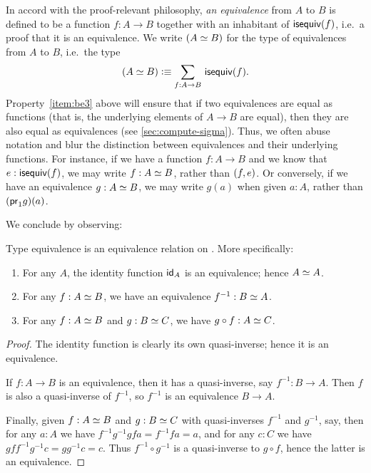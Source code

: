 In accord with the proof-relevant philosophy,
%
\emph{an equivalence} from $A$ to $B$ is defined to be a function $f:A\to B$ together with an inhabitant of $\isequiv (f)$, i.e.\ a proof that it is an equivalence.
We write $(\eqv A B)$ for the type of equivalences from $A$ to $B$, i.e.\ the type
\begin{equation}\label{eq:eqv}
  (\eqv A B) \defeq \sm{f:A\to B} \isequiv(f).
\end{equation}
Property~\ref{item:be3} above will ensure that if two equivalences are equal as functions (that is, the underlying elements of $A\to B$ are equal), then they are also equal as equivalences (see \cref{sec:compute-sigma}).
Thus, we often abuse notation and blur the distinction between equivalences and their underlying functions.
For instance, if we have a function $f:A\to B$ and we know that $e:\isequiv(f)$, we may write $f:\eqv A B$, rather than $\tup{f}{e}$.
Or conversely, if we have an equivalence $g:\eqv A B$, we may write $g(a)$ when given $a:A$, rather than $(\proj1 g)(a)$.

We conclude by observing:

\begin{lem}\label{thm:equiv-eqrel}
  Type equivalence is an equivalence relation on \type.
  More specifically:
  \begin{enumerate}
  \item For any $A$, the identity function $\idfunc[A]$ is an equivalence; hence $\eqv A A$.
  \item For any $f:\eqv A B$, we have an equivalence $f^{-1} : \eqv B A$.
  \item For any $f:\eqv A B$ and $g:\eqv B C$, we have $g\circ f : \eqv A C$.
  \end{enumerate}
\end{lem}
\begin{proof}
  The identity function is clearly its own quasi-inverse; hence it is an equivalence.

  If $f:A\to B$ is an equivalence, then it has a quasi-inverse, say $f^{-1}:B\to A$.
  Then $f$ is also a quasi-inverse of $f^{-1}$, so $f^{-1}$ is an equivalence $B\to A$.

  Finally, given $f:\eqv A B$ and $g:\eqv B C$ with quasi-inverses $f^{-1}$ and $g^{-1}$, say, then for any $a:A$ we have $f^{-1} g^{-1} g f a = f^{-1} f a = a$, and for any $c:C$ we have $g f f^{-1} g^{-1} c = g g^{-1} c = c$.
  Thus $f^{-1} \circ g^{-1}$ is a quasi-inverse to $g\circ f$, hence the latter is an equivalence.
\end{proof}

